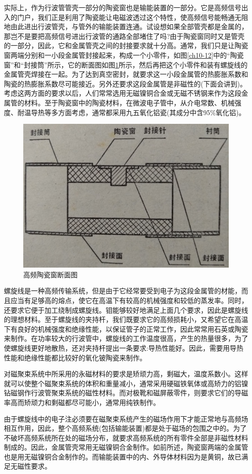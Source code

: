 实际上，作为行波管管壳一部分的陶瓷窗也是输能装置的一部分。它是高频信号出入的门户，我们正是利用了陶瓷能让电磁波透过这个特性，使高频信号能畅通无阻地由此进出行波管壳，与管外的输能装置连通。试设想如果全部管壳都是金属的，那岂不是要把高频信号进出行波管的通路全部堵住了吗?由于陶瓷窗同时又是管壳的一部分，因此，它和金属管壳之间的封接要求就十分高。通常，我们只是让陶瓷窗两端分别和一小段金属管封接起来，构成一个小零件，如图\ref{ch10-12}中的“陶瓷窗”和“封接筒”所示，它的断面图如图\ref{ch10-3}所示，然后再把这个小零件和装有螺旋线的金属管壳焊接在一起。为了达到真空密封，就要求这一小段金属管的热膨胀系数和陶瓷的热膨胀系数尽可能接近。另外还要求这段金属管是非磁性的(下面会讲到)。考虑这两方面的要求以后，人们常常选用无磁镍铜合金或无磁不锈钢来作为这段金属管的材料。至于陶瓷窗中的陶瓷材料，在微波电子管中，从介电常数、机械强度、耐温导热等多方面考虑，通常都采用九五氧化铝瓷(其成分中含95\%氧化铝)。
\begin{figure}[phtb]
	\centering
	\includegraphics[width=0.6\linewidth]{figure/ch10-3}
	\caption{ 高频陶瓷窗断面图}
	\label{ch10-3}
\end{figure}

螺旋线是一种高频传输系统，但是由于它经常要受到电子为这段金属管的材能，而且应当有足够高的熔点，使它在高温下有较高的机械强度和较低的蒸发率。同时，还要求它便于加工绕制成螺旋线。钼能够较好地满足上面几个要求，因此是螺旋线的理想材料。至于螺旋线的夹持杆，我们既要求它的高频损耗小，又希望它在高温下有良好的机械强度和绝缘性能，以保证管子的正常工作，因此常常用石英或陶瓷来制作。在功率较大的行波管中，螺旋线的工作温度很高，产生的热量很多，为了使螺旋线更好地散热，还对夹持杆提出一条要求:导热性能好。因此，需要用导热性能和绝缘性能都比较好的氧化铍陶瓷来制作。


对磁聚束系统中所采用的永磁材料的要求是矫顽力高，剩磁大，温度系数小。这样就可以使整个磁聚束系统的体积和重量减小，通常采用硬磁铁氧体或高矫力的铝镍钻磁钢作行波管聚束系统的磁性材料。而对极靴和磁屏蔽零件，则要求它们的导磁率高而矫顽力和剩磁都尽可能小，通常用纯铁制作。

由于螺旋线中的电子注必须要在磁聚束系统产生的磁场作用下才能正常地与高频场相互作用，因此，整个高频系统(包括输能装置)都是处于磁场的包围之中的。为了不破坏高频系统所在处的磁场分布，就要求高频系统的所有零件全部是非磁性材料制成的。因此，金属管壳常用无磁镍铜合金制作。如前所述，陶瓷窗两端的金属管也是用无磁镍铜合金制作的。而输能装置中的内、外导体材料因为是黄铜，故已满足无磁性要求。


